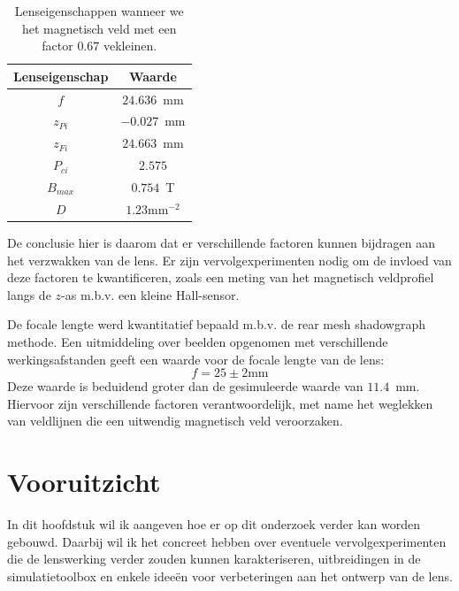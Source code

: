 \documentclass[we,twoside,openright,a4paper,11pt]{uantwerpenbamathesis}
\begin{document}
\begin{table}[H]
\centering
\begin{tabular}{@{}cl@{}}
\toprule
Lenseigenschap                     & \multicolumn{1}{c}{Waarde}  \\ \midrule
\multicolumn{1}{|c|}{$f$}        & \multicolumn{1}{c|}{$24.636$~mm}  \\ \midrule
\multicolumn{1}{|c|}{$z_{Pi}$}        & \multicolumn{1}{c|}{$-0.027$~mm} \\ \midrule
\multicolumn{1}{|c|}{$z_{Fi}$}        & \multicolumn{1}{c|}{$24.663$~mm}  \\ \midrule
\multicolumn{1}{|c|}{$P_{ci}$} & \multicolumn{1}{c|}{$2.575$}  \\ \midrule
\multicolumn{1}{|c|}{$B_{max}$} & \multicolumn{1}{c|}{$0.754$~T}    \\ \midrule
\multicolumn{1}{|c|}{$D$}        & \multicolumn{1}{c|}{$1.23\mathrm{mm}^{-2}$}    \\ \midrule
\end{tabular}
\caption{Lenseigenschappen wanneer we het magnetisch veld met een factor $0.67$ vekleinen.}\label{tab:lens_properties_67}
\end{table}

De conclusie hier is daarom dat er verschillende factoren kunnen bijdragen aan het verzwakken van de lens. Er zijn vervolgexperimenten nodig om de invloed van deze factoren te kwantificeren, zoals een meting van het magnetisch veldprofiel langs de $z$-as m.b.v. een kleine Hall-sensor.

\begin{tcolorbox}[colback=blue!10!white, colframe=blue!40!white, sharp corners,title=Realisatie objectief 8]
    De focale lengte werd kwantitatief bepaald m.b.v. de rear mesh shadowgraph methode. Een uitmiddeling over beelden opgenomen met verschillende werkingsafstanden geeft een waarde voor de focale lengte van de lens:
    \begin{equation*}
        f = 25 \pm 2 \mathrm{mm}
    \end{equation*}
    Deze waarde is beduidend groter dan de gesimuleerde waarde van $11.4$~mm. Hiervoor zijn verschillende factoren verantwoordelijk, met name het weglekken van veldlijnen die een uitwendig magnetisch veld veroorzaken.
\end{tcolorbox}

\chapter{Vooruitzicht}\label{ch:vooruitzicht}
In dit hoofdstuk wil ik aangeven hoe er op dit onderzoek verder kan worden gebouwd. Daarbij wil ik het concreet hebben over eventuele vervolgexperimenten die de lenswerking verder zouden kunnen karakteriseren, uitbreidingen in de simulatietoolbox en enkele ideeën voor verbeteringen aan het ontwerp van de lens.
\end{document}
